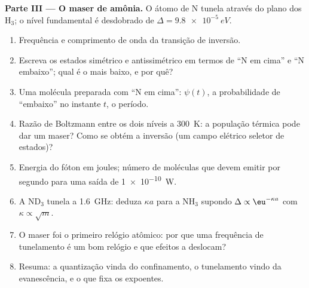 \begin{problem}
\textbf{Parte III --- O maser de amônia.}
O átomo de N tunela através do plano dos H$_3$; o nível fundamental é desdobrado
de $\Delta = \qty{9.8e-5}{eV}$.
\begin{enumerate}[resume]
  \item Frequência e comprimento de onda da transição de inversão.
  \item Escreva os estados simétrico e antissimétrico em termos de
        ``N em cima'' e ``N embaixo''; qual é o mais baixo, e por quê?
  \item Uma molécula preparada com ``N em cima'': $\psi(t)$, a probabilidade de
        ``embaixo'' no instante $t$, o período.
  \item Razão de Boltzmann entre os dois níveis a \qty{300}{K}: a
        população térmica pode dar um maser? Como se obtém a inversão
        (um campo elétrico seletor de estados)?
  \item Energia do fóton em joules; número de moléculas que devem emitir
        por segundo para uma saída de \qty{1e-10}{W}.
  \item A ND$_3$ tunela a \qty{1.6}{GHz}: deduza $\kappa a$ para a NH$_3$
        supondo $\Delta \propto \eu^{-\kappa a}$ com $\kappa \propto \sqrt{m}$.
  \item O maser foi o primeiro relógio atômico: por que uma frequência de
        tunelamento é um bom relógio e que efeitos a deslocam?
  \item Resuma: a quantização vinda do confinamento, o tunelamento vindo da
        evanescência, e o que fixa os expoentes.
\end{enumerate}
\end{problem}
